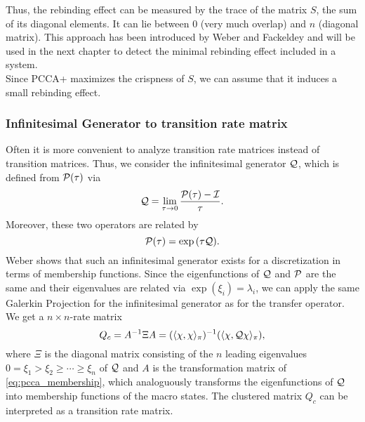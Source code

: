 Thus, the rebinding effect can be measured by the trace of the matrix $S$, the sum of its diagonal elements. It can lie between $0$ (very much overlap) and $n$ (diagonal matrix). This approach has been introduced by Weber and Fackeldey\cite{weber2014} and will be used in the next chapter to detect the minimal rebinding effect included in a system.
\\



Since PCCA+ maximizes the crispness of $S$, we can assume that it induces a small rebinding effect. 

\subsubsection*{Infinitesimal Generator to transition rate matrix}

Often it is more convenient to analyze transition rate matrices instead of transition matrices.
Thus, we consider the infinitesimal generator $\mathcal{Q}$, which is defined from $\mathcal{P}(\tau)$ via
\begin{equation*}
\mathcal{Q} = \lim_{\tau \rightarrow 0} \frac{\mathcal{P}(\tau)-\mathcal{I}}{\tau}.
\end{equation*}
Moreover, these two operators are related by 
\begin{equation*}
\mathcal{P}(\tau) = \exp{(\tau\mathcal{Q})}.
\end{equation*}
Weber\cite{weber2011subspace} shows that such an infinitesimal generator exists for a discretization in terms of membership functions.
Since the eigenfunctions of $\mathcal{Q}$ and $\mathcal{P}$ are the same and their eigenvalues are related via $\exp{(\xi_i)} = \lambda_i$, we can apply the same Galerkin Projection for the infinitesimal generator as for the transfer operator.
We get a $n\times n$-rate matrix
\begin{equation}
\label{eq:galerkin_infinitesimal}
Q_c = A^{-1} \Xi A = (\langle \chi, \chi \rangle_\pi)^{-1} (\langle \chi, \mathcal{Q} \chi \rangle_\pi),
\end{equation}
where $\Xi$ is the diagonal matrix consisting of the $n$ leading eigenvalues $0 = \xi_1 > \xi_2 \geq \cdots \geq \xi_n$ of $\mathcal{Q}$ and $A$ is the transformation matrix of \eqref{eq:pcca_membership}, which analoguously transforms the eigenfunctions of $\mathcal{Q}$ into membership functions of the macro states.
The clustered matrix $Q_c$ can be interpreted as a transition rate matrix. 
